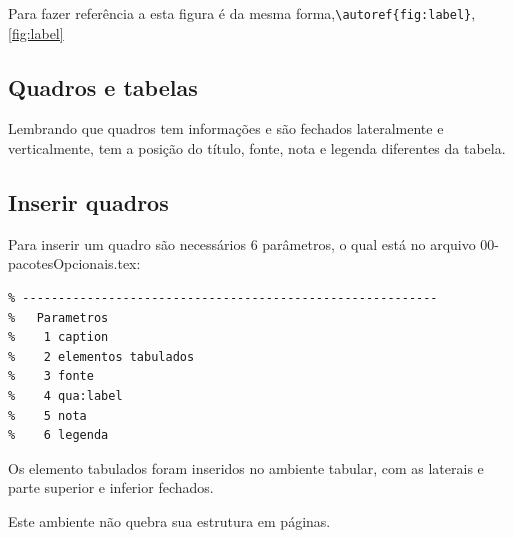 
Para fazer referência a esta figura é da mesma forma,\verb+\autoref{fig:label}+, \autoref{fig:label}

\subsection[Quadros e tabelas]{Quadros e tabelas}

Lembrando que quadros tem informações e são fechados lateralmente e verticalmente, tem a posição do título, fonte, nota e legenda diferentes da tabela.
\subsection[Quadros]{Inserir quadros}\label{ssec:quadros}

Para inserir um quadro são necessários 6 parâmetros, o qual está no arquivo 00-pacotesOpcionais.tex:

\begin{lstlisting}
% ----------------------------------------------------------
%   Parametros
%    1 caption
%    2 elementos tabulados
%    3 fonte
%    4 qua:label
%    5 nota
%    6 legenda
\end{lstlisting}

Os elemento tabulados foram inseridos no ambiente tabular, com as laterais e parte superior e inferior fechados.

Este ambiente não quebra sua estrutura em páginas.

